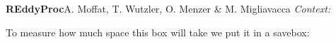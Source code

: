 
  {\vspace{.2cm}\textbf{REddyProc}\hfill\normalsize{A. Moffat, T. Wutzler, O. Menzer \& M. Migliavacca}}
\alert{\textit{Context:}}

To measure how much space this box will take we put it in a 
savebox:

